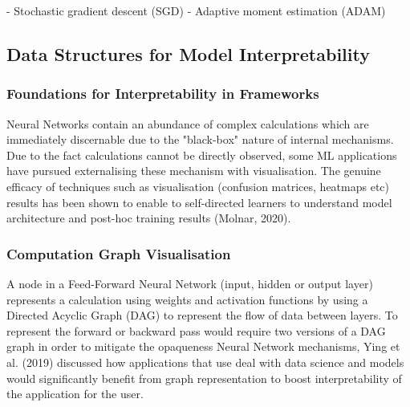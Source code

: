 \documentclass{article}
\begin{document}
- Stochastic gradient descent (SGD)
- Adaptive moment estimation (ADAM)


\subsection{Data Structures for Model Interpretability} %
\subsubsection{Foundations for Interpretability in Frameworks}
Neural Networks contain an abundance of complex calculations which are immediately discernable due to the "black-box" nature of internal mechanisms. Due to the fact calculations cannot be directly observed, some ML applications have pursued externalising these mechanism with visualisation. The genuine efficacy of techniques such as visualisation (confusion matrices, heatmaps etc) results has been shown to enable to self-directed learners to understand model architecture and post-hoc training results (Molnar, 2020).
\subsubsection{Computation Graph Visualisation} %
A node in a Feed-Forward Neural Network (input, hidden or output layer) represents a calculation using weights and activation functions by using a Directed Acyclic Graph (DAG) to represent the flow of data between layers. To represent the forward or backward pass would require two versions of a DAG graph in order to mitigate the opaqueness Neural Network mechanisms, Ying et al. (2019) discussed how applications that use deal with data science and models would significantly benefit from graph representation to boost interpretability of the application for the user.
\end{document}

